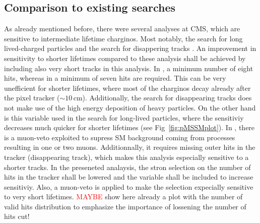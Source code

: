 
\subsection{Comparison to existing searches}
As already mentioned before, there were several analyses at CMS, which are sensitive to intermediate lifetime charginos. 
Most notably, the search for long lived-charged particles \cite{bib:CMS:HSCP_8TeV} and the search for disappering tracks \cite{bib:CMS:DT_8TeV}.
An improvement in sensitivity to shorter lifetimes compared to these analysis shall be achieved by including also very short tracks in this analysis.
In \cite{bib:CMS:HSCP_8TeV}, a minimum number of eight hits, whereas in \cite{bib:CMS:DT_8TeV} a minimum of seven hits are required. 
This can be very unefficient for shorter lifetimes, where most of the charginos decay already after the pixel tracker ($\sim 10\,\text{cm}$).
Additionally, the search for disappearing tracks does not make use of the high energy deposition of heavy particles. 
On the other hand is this variable used in the search for long-lived particles, where the sensitiviy decreases much quicker for shorter lifetimes (see Fig~\ref{fig:pMSSMplot}).
In \cite{bib:CMS:DT_8TeV}, there is a muon-veto exploited to supress SM background coming from processes resulting in one or two muons. 
Additionnally, it requires missing outer hits in the tracker (disappearing track), which makes this analysis especially sensitive to a shorter tracks.
In the preseneted analaysis, the stron selection on the number of hits in the tracker shall be lowered and the variable \dedx shall be included to increase sensitiviy.
Also, a muon-veto is applied to make the selection expecially sensitive to very short lifetimes.
\textcolor{red}{MAYBE} show here already a plot with the number of valid hits distribution to emphasize the importance of lossening the number of hits cut!
